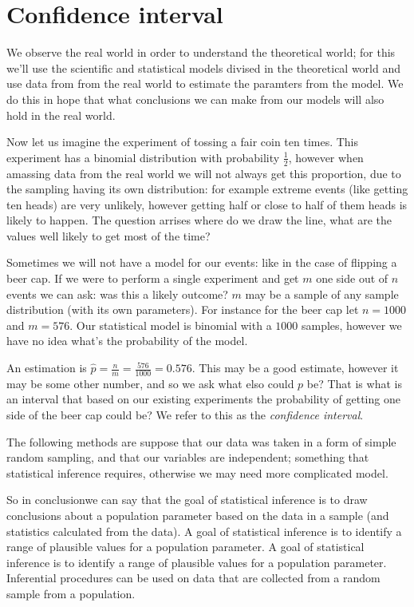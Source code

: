 \section{Confidence interval}

We observe the real world in order to understand the theoretical world; for this
we'll use the scientific and statistical models divised in the theoretical world
and use data from from the real world to estimate the paramters from the model.
We do this in hope that what conclusions we can make from our models will also
hold in the real world.


Now let us imagine the experiment of tossing a fair coin ten times. This
experiment has a binomial distribution with probability $\frac{1}{2}$, however
when amassing data from the real world we will not always get this proportion,
due to the sampling having its own distribution: for example extreme events
(like getting ten heads) are very unlikely, however getting half or close to
half of them heads is likely to happen. The question arrises where do we draw
the line, what are the values well likely to get most of the time?

Sometimes we will not have a model for our events: like in the case of flipping
a beer cap. If we were to perform a single experiment and get $m$ one side
out of $n$ events we can ask: was this a likely outcome? $m$ may be a sample of
any sample distribution (with its own parameters). For instance for the beer cap
let $n=1000$ and $m=576$. Our statistical model is binomial with a $1000$
samples, however we have no idea what's the probability of the model. 

An estimation is $\hat{p}=\frac{n}{m}=\frac{576}{1000}=0.576$. This may be a
good estimate, however it may be some other number, and so we ask what elso
could $p$ be? That is what is an interval that based on our existing experiments
the probability of getting one side of the beer cap could be? We refer to this
as the \emph{confidence interval}. 

The following methods are suppose that our data was taken in a form of simple
random sampling, and that our variables are independent; something that
statistical inference requires, otherwise we may need more complicated model.

So in conclusionwe can say that the goal of statistical inference is to draw
conclusions about a population parameter based on the data in a sample (and
statistics calculated from the data). A goal of statistical inference is to
identify a range of plausible values for a population parameter. A goal of
statistical inference is to identify a range of plausible values for a
population parameter. Inferential procedures can be used on data that are
collected from a random sample from a population.


